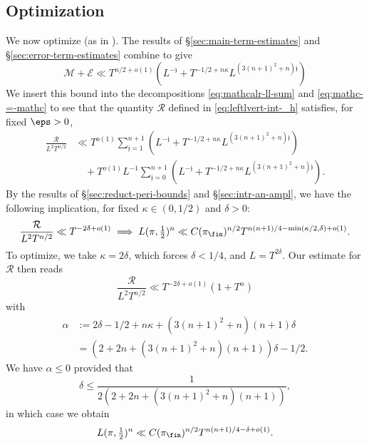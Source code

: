 \subsection{Optimization}\label{sec:optimization}
We now optimize (as in \cite[\S6.6]{2020arXiv201202187N}).  The results of \S\ref{sec:main-term-estimates} and \S\ref{sec:error-term-estimates} combine to give
\begin{equation*}
  \mathcal{M} + \mathcal{E} \ll
  T^{n/2 + o(1)} (
  L^{-\mathfrak{j}}+ T^{-1/2 + n \kappa} L^{(3(n+1)^2 + n) \mathfrak{j}})
\end{equation*}
We insert this bound into the decompositions \eqref{eq:mathcalr-ll-sum} and \eqref{eq:mathc-=-mathc} to see that the quantity $\mathcal{R}$ defined in \eqref{eq:leftlvert-int-_h} satisfies, for fixed $\eps > 0$,
\begin{align*}
  \frac{\mathcal{R}}{L^2 T^{n/2}}
  &\ll T^{o(1)}  \sum_{\mathfrak{j}=1}^{n+1} \left( L^{-\mathfrak{j}} + T^{-1/2 + n \kappa} L^{(3(n+1)^2  + n) \mathfrak{j}}
    \right) \\
  &\quad + T^{o(1)} L^{-1} \sum_{\mathfrak{j} = 0}^{n+1} \left(
    L^{- \mathfrak{j}} + T^{-1/2 + n \kappa}  L^{(3(n+1)^2  + n) \mathfrak{j}}
    \right).
\end{align*}
By the results of \S\ref{sec:reduct-peri-bounds} and \S\ref{sec:intr-an-ampl}, we have the following implication, for fixed $\kappa \in (0, 1/2)$ and $\delta > 0$:
\begin{equation*}
  \frac{\mathcal{R}}{L^2 T^{n/2}} \ll T^{- 2 \delta + o(1)}
  \implies
  L(\pi,\tfrac{1}{2})^n \ll C(\pi_{\fin})^{n/2} T^{n(n+1)/4 - \min(\kappa/2,\delta) + o(1)}.
\end{equation*}
To optimize, we take $\kappa = 2 \delta$, which forces $\delta < 1/4$, and $L = T^{2 \delta}$.  Our estimate for $\mathcal{R}$ then reads
\[
  \frac{\mathcal{R}}{L^2 T^{n/2}}
  \ll
  T^{- 2 \delta + o(1)} ( 1 + T^{\alpha} )
\]
with
\begin{align*}
  \alpha
  &:=
    2 \delta -1/2 + n \kappa
    +
    (3 (n+1)^2 + n)(n+1) \delta  \\
  &=
    (2 + 2 n + (3 (n+1)^2  + n)(n+1)) \delta - 1/2.
\end{align*}
We have $\alpha \leq 0$ provided that
\begin{equation*}
  \delta \leq \frac{1}{2 (2 + 2 n + (3 (n+1)^2 + n)(n+1))},
\end{equation*}
in which case we obtain
\begin{equation*}
  L(\pi,\tfrac{1}{2})^n \ll C(\pi_{\fin})^{n/2} T^{n(n+1)/4 - \delta + o(1)}.
\end{equation*}
